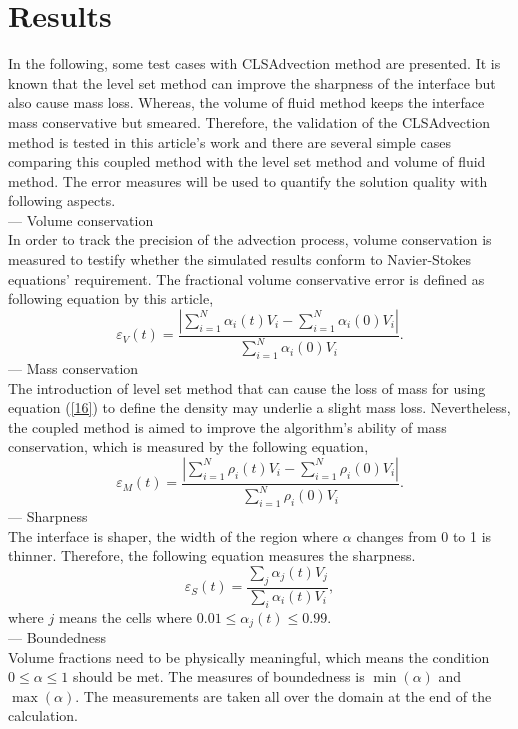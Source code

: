\section{Results}
In the following, some test cases with CLSAdvection method are presented. It is known that the level set method can improve the sharpness of the interface but also cause mass loss. Whereas, the volume of fluid method keeps the interface mass conservative but smeared. Therefore, the validation of the CLSAdvection method is tested in this article's work and there are several simple cases comparing this coupled method with the level set method and volume of fluid method. The error measures will be used to quantify the solution quality with following aspects.\\
--- Volume conservation\\
In order to track the precision of the advection process, volume conservation is measured to testify whether the simulated results conform to Navier-Stokes equations' requirement. The fractional volume conservative error is defined as following equation by this article\cite{gopala2008volume},
\begin{equation}\label{28}
\varepsilon_{V}(t)=\frac{\left|\sum\limits^N_{i=1}\alpha_i(t)V_i-\sum\limits^N_{i=1}\alpha_i(0)V_i\right|}{\sum\limits^N_{i=1}\alpha_{i}(0)V_i}.
\end{equation}
--- Mass conservation\\
The introduction of level set method that can cause the loss of mass for using equation (\ref{16}) to define the density may underlie a slight mass loss. Nevertheless, the coupled method is aimed to improve the algorithm's ability of mass conservation, which is measured by the following equation,
\begin{equation}\label{29}
\varepsilon_{M}(t)=\frac{\left|\sum\limits^N_{i=1}\rho_i(t)V_i-\sum\limits_{i=1}^N\rho_i(0)V_i\right|}{\sum\limits^N_{i=1}\rho_i(0)V_i}.
\end{equation}
--- Sharpness\\
The interface is shaper, the width of the region where $\alpha$ changes from 0 to 1 is thinner. Therefore, the following equation measures the sharpness.
\begin{equation}\label{30}
\varepsilon_{S}(t)=\frac{\sum_j\alpha_j(t)V_j}{\sum_i\alpha_i(t)V_i},
\end{equation}
where $j$ means the cells where $0.01\leq\alpha_j(t)\leq{0.99}$.\\
--- Boundedness\\
Volume fractions need to be physically meaningful, which means the condition $0\leq\alpha\leq{1}$ should be met. The measures of boundedness is $\min{(\alpha)}$ and $\max{(\alpha)}$. The measurements are taken all over the domain at the end of the calculation.\\ 
